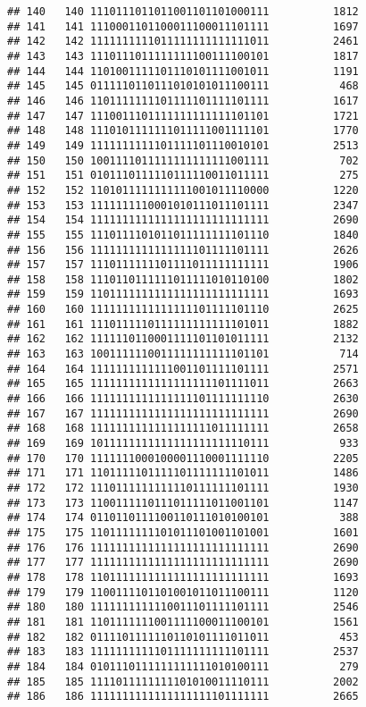 \documentclass[]{article}
\begin{document}
\begin{verbatim}
## 140   140 1110111011011001101101000111          1812
## 141   141 1110001101100011100011101111          1697
## 142   142 1111111111011111111111111011          2461
## 143   143 1110111011111111100111100101          1817
## 144   144 1101001111101110101111001011          1191
## 145   145 0111110110111010101011100111           468
## 146   146 1101111111101111101111101111          1617
## 147   147 1110011101111111111111101101          1721
## 148   148 1110101111111011111001111101          1770
## 149   149 1111111111101111101110010101          2513
## 150   150 1001111011111111111111001111           702
## 151   151 0101110111110111110011011111           275
## 152   152 1101011111111111001011110000          1220
## 153   153 1111111110001010111011101111          2347
## 154   154 1111111111111111111111111111          2690
## 155   155 1110111101011011111111101110          1840
## 156   156 1111111111111111101111101111          2626
## 157   157 1110111111101111011111111111          1906
## 158   158 1110110111111011111010110100          1802
## 159   159 1101111111111111111111111111          1693
## 160   160 1111111111111111101111101110          2625
## 161   161 1110111110111111111111101011          1882
## 162   162 1111110110001111101101011111          2132
## 163   163 1001111110011111111111101101           714
## 164   164 1111111111111001101111101111          2571
## 165   165 1111111111111111111101111011          2663
## 166   166 1111111111111111101111111110          2630
## 167   167 1111111111111111111111111111          2690
## 168   168 1111111111111111111011111111          2658
## 169   169 1011111111111111111111110111           933
## 170   170 1111111000100001110001111110          2205
## 171   171 1101111101111101111111101011          1486
## 172   172 1110111111111110111111101111          1930
## 173   173 1100111110111011111011001101          1147
## 174   174 0110110111100110111010100101           388
## 175   175 1101111111101011101001101001          1601
## 176   176 1111111111111111111111111111          2690
## 177   177 1111111111111111111111111111          2690
## 178   178 1101111111111111111111111111          1693
## 179   179 1100111101101001011011100111          1120
## 180   180 1111111111110011101111101111          2546
## 181   181 1101111111001111100011100101          1561
## 182   182 0111101111110110101111011011           453
## 183   183 1111111111101111111111101111          2537
## 184   184 0101110111111111111010100111           279
## 185   185 1111011111111101010011110111          2002
## 186   186 1111111111111111111101111111          2665

\end{verbatim}
\end{document}
